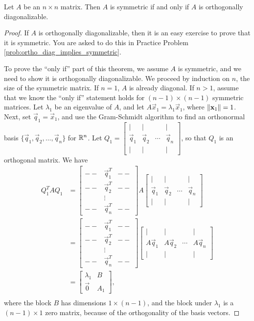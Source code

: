 \documentclass{ximera}
\begin{document}
\begin{theorem}\label{th:PrinAxes}
Let  $A$ be an $n \times n$ matrix.  Then $A$ is symmetric if and only if $A$ is orthogonally diagonalizable.
\end{theorem}
\begin{proof}
If $A$ is orthogonally diagonalizable, then it is an easy exercise to prove that it is symmetric.  You are asked to do this in Practice Problem \ref{prob:ortho_diag_implies_symmetric}.

To prove the ``only if'' part of this theorem, we assume $A$ is symmetric, and we need to show it is orthogonally diagonalizable.  We proceed by induction on $n$, the size of the symmetric matrix. If $n = 1$, $A$ is already diagonal. If $n > 1$, assume that we know the ``only if'' statement holds for $(n - 1) \times (n - 1)$ symmetric matrices. Let $\lambda_{1}$ be an eigenvalue of $A$, and let $A\vec{x}_{1} = \lambda_{1}\vec{x}_{1}$, where $\left\lVert\mathbf{x}_{1}\right\rVert = 1$. Next, set $\vec{q}_{1}=\vec{x}_{1}$, and use the Gram-Schmidt algorithm to find an orthonormal basis $\{\vec{q}_{1}, \vec{q}_{2}, \dots, \vec{q}_{n}\}$ for $\mathbb{R}^n$. Let $Q_{1} = \begin{bmatrix}
| & | &   & | \\
\vec{q}_1 & \vec{q}_2  & \cdots & \vec{q}_n \\
| & | &   & |
\end{bmatrix}$, so that $Q_{1}$ is an orthogonal matrix.  We have
\begin{align*}
Q_{1}^TAQ_{1} &= \begin{bmatrix}
-- & \vec{q}_{1}^T & -- \\ -- & \vec{q}_{2}^T & -- \\ & \vdots & \\ -- & \vec{q}_{n}^T & --
\end{bmatrix} A \begin{bmatrix}
| & | &   & | \\
\vec{q}_1 & \vec{q}_2  & \cdots & \vec{q}_n \\
| & | &   & |
\end{bmatrix} \\
&= \begin{bmatrix}
-- & \vec{q}_{1}^T & -- \\ -- & \vec{q}_{2}^T & -- \\ & \vdots & \\ -- & \vec{q}_{n}^T & --
\end{bmatrix} \begin{bmatrix}
| & | &   & | \\
A\vec{q}_1 & A\vec{q}_2  & \cdots & A\vec{q}_n \\
| & | &   & |
\end{bmatrix} \\
&=
\begin{bmatrix}
\lambda_{1} & B \\
\vec{0} & A_{1}
\end{bmatrix},\\
\end{align*} 
where the block $B$ has dimensions $1 \times (n-1)$, and the block under $\lambda_1$ is a $(n-1) \times 1$ zero matrix, because of the orthogonality of the basis vectors.


\end{proof}
\end{document}
